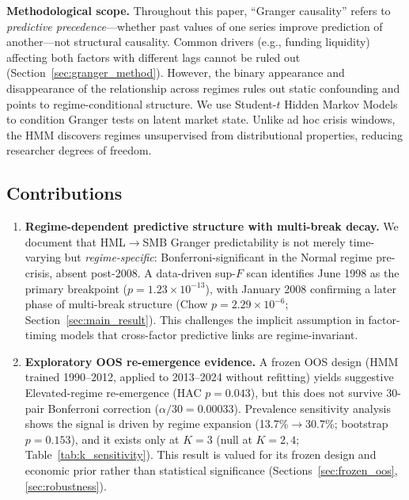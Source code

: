 \documentclass[sigconf,anonymous]{acmart}
\begin{document}
\textbf{Methodological scope.} Throughout this paper, ``Granger causality'' refers
to \emph{predictive precedence}---whether past values of one series improve prediction
of another---not structural causality. Common drivers (e.g., funding liquidity)
affecting both factors with different lags cannot be ruled out
(Section~\ref{sec:granger_method}). However, the binary appearance and
disappearance of the relationship across regimes rules out static confounding
and points to regime-conditional structure.
We use Student-$t$ Hidden Markov Models to condition Granger tests on latent
market state. Unlike ad hoc crisis windows, the HMM discovers regimes
unsupervised from distributional properties, reducing researcher degrees of
freedom.

\subsection{Contributions}

\begin{enumerate}
    \item \textbf{Regime-dependent predictive structure with multi-break decay.}
    We document that HML$\to$SMB Granger predictability is not merely time-varying
    but \emph{regime-specific}: Bonferroni-significant in the Normal regime
    pre-crisis, absent post-2008. A data-driven sup-$F$ scan identifies
    June 1998 as the primary breakpoint ($p = 1.23\times10^{-13}$), with
    January 2008 confirming a later phase of multi-break structure
    (Chow $p = 2.29\times10^{-6}$; Section~\ref{sec:main_result}).
    This challenges the implicit assumption
    in factor-timing models that cross-factor predictive links are
    regime-invariant.

    \item \textbf{Exploratory OOS re-emergence evidence.}
    A frozen OOS design (HMM trained 1990--2012, applied to 2013--2024
    without refitting) yields suggestive Elevated-regime re-emergence
    (HAC $p = 0.043$), but this does not survive 30-pair Bonferroni
    correction ($\alpha/30 = 0.00033$). Prevalence sensitivity analysis
    shows the signal is driven by regime expansion
    (13.7\%$\to$30.7\%; bootstrap $p = 0.153$), and it exists only at
    $K{=}3$ (null at $K{=}2,4$; Table~\ref{tab:k_sensitivity}).
    This result is valued for its frozen design and economic
    prior rather than statistical significance
    (Sections~\ref{sec:frozen_oos}, \ref{sec:robustness}).
\end{enumerate}
\end{document}
